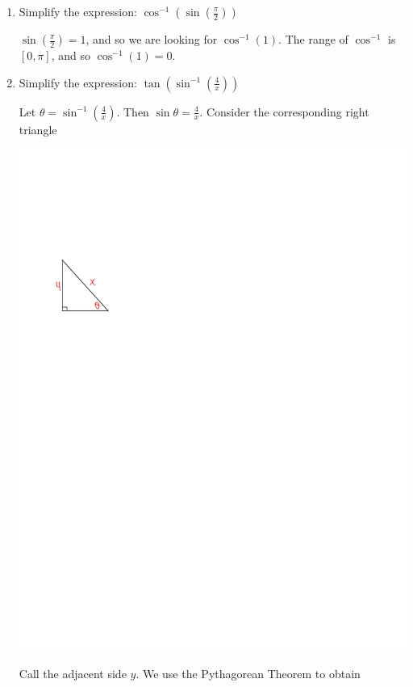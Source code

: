 \documentclass[nooutcomes]{ximera}
\begin{document}
			
			
\begin{problem}
	
			\begin{enumerate}
			
			\item  Simplify the expression:  $\cos^{-1} \left( \sin \left( \frac{\pi }{2} \right) \right) $ 
			
			 \begin{freeResponse}			 
			 $ \sin \left( \frac{\pi}{2} \right) = 1$, and so we are looking for $\cos^{-1}(1)$.  The range of $\cos^{-1}$ is $[0, \pi]$, and so $\cos^{-1} (1) = 0$.  
			 \end{freeResponse}
			 
			 
			 
			 
			 
			 
			
			\item  Simplify the expression:  $ \tan \left( \sin^{-1} \left( \frac{4}{x} \right) \right) $ 
			
			 \begin{freeResponse}			 
			 Let $\theta = \sin^{-1} \left( \frac{4}{x} \right) $.  Then $\sin \theta = \frac{4}{x}$.  Consider the corresponding right triangle
			 
			 \begin{image}
			 \includegraphics[trim=60 525 300 170]{Figure5.pdf}
			 \end{image}
			 Call the adjacent side $y$.  We use the Pythagorean Theorem to obtain
			

\end{freeResponse}
\end{enumerate}
\end{problem}
\end{document}

